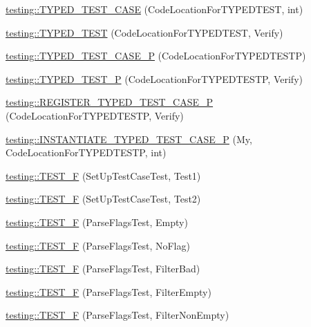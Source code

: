 \begin{DoxyCompactItemize}
\mbox{\hyperlink{namespacetesting_af0459cc6cdfbbae821caf802c7f2bb72}{testing\+::\+T\+Y\+P\+E\+D\+\_\+\+T\+E\+S\+T\+\_\+\+C\+A\+SE}} (Code\+Location\+For\+T\+Y\+P\+E\+D\+T\+E\+ST, int)
\item 
\mbox{\hyperlink{namespacetesting_a400c572f732b06e836d6b3a5adfc4cf7}{testing\+::\+T\+Y\+P\+E\+D\+\_\+\+T\+E\+ST}} (Code\+Location\+For\+T\+Y\+P\+E\+D\+T\+E\+ST, Verify)
\item 
\mbox{\hyperlink{namespacetesting_a439eefbc85668f74fd9e0c2cb7c7d0b0}{testing\+::\+T\+Y\+P\+E\+D\+\_\+\+T\+E\+S\+T\+\_\+\+C\+A\+S\+E\+\_\+P}} (Code\+Location\+For\+T\+Y\+P\+E\+D\+T\+E\+S\+TP)
\item 
\mbox{\hyperlink{namespacetesting_a3f3fbbc7ecc23117307b81deb8f4cfac}{testing\+::\+T\+Y\+P\+E\+D\+\_\+\+T\+E\+S\+T\+\_\+P}} (Code\+Location\+For\+T\+Y\+P\+E\+D\+T\+E\+S\+TP, Verify)
\item 
\mbox{\hyperlink{namespacetesting_a9fc96ebb1c0e7db169c4a5697c903f56}{testing\+::\+R\+E\+G\+I\+S\+T\+E\+R\+\_\+\+T\+Y\+P\+E\+D\+\_\+\+T\+E\+S\+T\+\_\+\+C\+A\+S\+E\+\_\+P}} (Code\+Location\+For\+T\+Y\+P\+E\+D\+T\+E\+S\+TP, Verify)
\item 
\mbox{\hyperlink{namespacetesting_a111c1dea1140652727ab97ddc13eb045}{testing\+::\+I\+N\+S\+T\+A\+N\+T\+I\+A\+T\+E\+\_\+\+T\+Y\+P\+E\+D\+\_\+\+T\+E\+S\+T\+\_\+\+C\+A\+S\+E\+\_\+P}} (My, Code\+Location\+For\+T\+Y\+P\+E\+D\+T\+E\+S\+TP, int)
\item 
\mbox{\hyperlink{namespacetesting_a01e948eb5427d31f70eafaf472e2bfa8}{testing\+::\+T\+E\+S\+T\+\_\+F}} (Set\+Up\+Test\+Case\+Test, Test1)
\item 
\mbox{\hyperlink{namespacetesting_a8fc2e448ce96e4da357a2129d49e86e3}{testing\+::\+T\+E\+S\+T\+\_\+F}} (Set\+Up\+Test\+Case\+Test, Test2)
\item 
\mbox{\hyperlink{namespacetesting_a9072b690c3c0e3b6af327fa72fe821c4}{testing\+::\+T\+E\+S\+T\+\_\+F}} (Parse\+Flags\+Test, Empty)
\item 
\mbox{\hyperlink{namespacetesting_ab2b5d94a0dd45cb06473bdd7900e23af}{testing\+::\+T\+E\+S\+T\+\_\+F}} (Parse\+Flags\+Test, No\+Flag)
\item 
\mbox{\hyperlink{namespacetesting_a3b7a3374630035ab3cf2125a0c960435}{testing\+::\+T\+E\+S\+T\+\_\+F}} (Parse\+Flags\+Test, Filter\+Bad)
\item 
\mbox{\hyperlink{namespacetesting_ac368692db2bffa72a1bf12f3469efec0}{testing\+::\+T\+E\+S\+T\+\_\+F}} (Parse\+Flags\+Test, Filter\+Empty)
\item 
\mbox{\hyperlink{namespacetesting_a31336a2ed0eea5de8066f5ae528a7ae0}{testing\+::\+T\+E\+S\+T\+\_\+F}} (Parse\+Flags\+Test, Filter\+Non\+Empty)

\end{DoxyCompactItemize}
